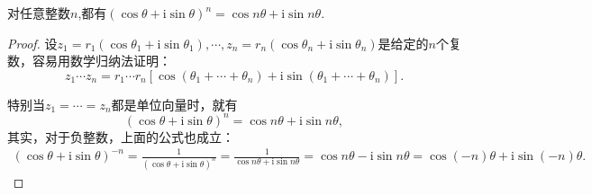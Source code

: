 \documentclass[../../main.tex]{subfiles}%
\begin{document}
\begin{theorem}[De Moivre公式]\label{theorem:De Moivre公式}
对任意整数$n$,都有$(\cos\theta + \mathrm{i}\sin\theta)^n = \cos n\theta + \mathrm{i}\sin n\theta.$
\end{theorem}
\begin{proof}

设\(z_1 = r_1(\cos\theta_1 + \mathrm{i}\sin\theta_1), \cdots, z_n = r_n(\cos\theta_n + \mathrm{i}\sin\theta_n)\)是给定的\(n\)个复数，容易用数学归纳法证明：
\[
z_1 \cdots z_n = r_1 \cdots r_n[\cos(\theta_1 + \cdots + \theta_n) + \mathrm{i}\sin(\theta_1 + \cdots + \theta_n)].
\]

特别当\(z_1 = \cdots = z_n\)都是单位向量时，就有
\[
(\cos\theta + \mathrm{i}\sin\theta)^n = \cos n\theta + \mathrm{i}\sin n\theta,
\]
其实，对于负整数，上面的公式也成立：
\begin{align*}
(\cos\theta + \mathrm{i}\sin\theta)^{-n} = \frac{1}{(\cos\theta + \mathrm{i}\sin\theta)^n} = \frac{1}{\cos n\theta + \mathrm{i}\sin n\theta} = \cos n\theta - \mathrm{i}\sin n\theta = \cos(-n)\theta + \mathrm{i}\sin(-n)\theta.
\end{align*}

\end{proof}
\end{document}
